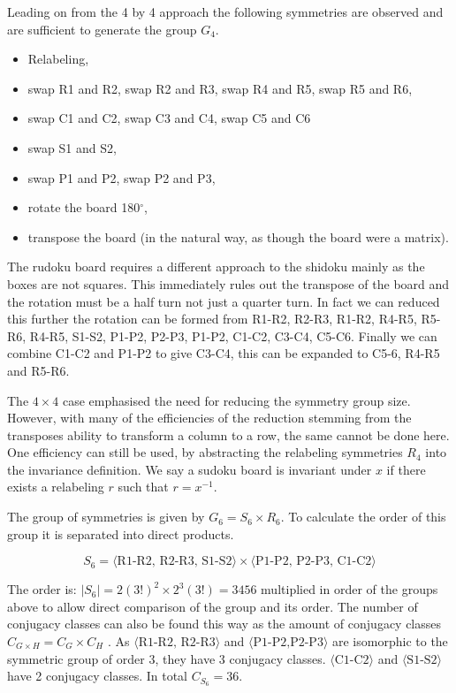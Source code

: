 \documentclass[a4paper,11pt]{report}
\newcounter{row}
\newcounter{col}
\begin{document}
{Leading on from the 4 by 4 approach the following symmetries are observed and are sufficient to generate the group $G_4$.
\begin{itemize}
\item Relabeling,
\item swap R1 and R2, swap R2 and R3, swap R4 and R5, swap R5 and R6,
\item swap C1 and C2, swap C3 and C4, swap C5 and C6
\item swap S1 and S2,
\item swap P1 and P2, swap P2 and P3,
\item rotate the board 180$^\circ$,
\item transpose the board (in the natural way, as though the board were a matrix).
\end{itemize}
The rudoku board requires a different approach to the shidoku mainly as the boxes are not squares. This immediately rules out the transpose of the board and the rotation must be a half turn not just a quarter turn. In fact we can reduced this further the rotation can be formed from R1-R2, R2-R3, R1-R2, R4-R5, R5-R6, R4-R5, S1-S2, P1-P2, P2-P3, P1-P2, C1-C2, C3-C4, C5-C6. Finally we can combine C1-C2 and P1-P2 to give C3-C4, this can be expanded to C5-6, R4-R5 and R5-R6.

The $4\times 4$ case emphasised the need for reducing the symmetry group size. However, with many of the efficiencies of the reduction stemming from the transposes ability to transform a column to a row, the same cannot be done here. One efficiency can still be used, by abstracting the relabeling symmetries $R_4$ into the invariance definition. We say a sudoku board is invariant under $x$ if there exists a relabeling $r$ such that $r=x^{-1}$. 

The group of symmetries is given by $G_6=S_6\times R_6$. To calculate the order of this group it is separated into direct products. 

\begin{equation}
S_6=\langle\text{R1-R2, R2-R3, S1-S2}\rangle\times \langle\text{P1-P2, P2-P3, C1-C2}\rangle 
\end{equation}

The order is: $|S_6|=2(3!)^2\times 2^3(3!)  =3456$ multiplied in order of the groups above to allow direct comparison of the group and its order. The number of conjugacy classes can also be found this way as the amount of conjugacy classes $C_{G\times H}= C_G \times C_H$ \cite{}. As $\langle\text{R1-R2, R2-R3}\rangle$ and $\langle\text{P1-P2,P2-P3}\rangle$ are isomorphic to the symmetric group of order 3, they have 3 conjugacy classes. $\langle\text{C1-C2}\rangle$ and $\langle\text{S1-S2}\rangle$ have 2 conjugacy classes. In total $C_{S_6}=36$.


}
\end{document}
